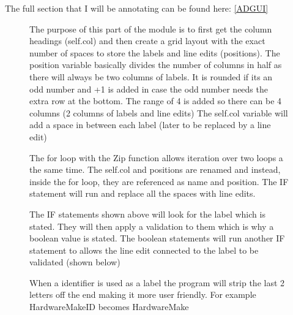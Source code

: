 The full section that I will be annotating can be found here: \ref{ADGUI}
\begin{landscape}

\begin{figure}[H]
    \caption{The purpose of this part of the module is to first get the column headings (self.col) and then create a grid layout with the exact number of spaces to store the labels and line edits (positions). The position variable basically divides the number of columns in half as there will always be two columns of labels. It is rounded if its an odd number and +1 is added in case the odd number needs the extra row at the bottom. The range of 4 is added so there can be 4 columns (2 columns of labels and line edits) \newline The self.col variable will add a space in between each label (later to be replaced by a line edit)}  
\end{figure}

\begin{figure}[H]
    \caption{The for loop with the Zip function allows iteration over two loops a the same time. The self.col and positions are renamed and instead, inside the for loop, they are referenced as name and position. \newline The IF statement will run and replace all the spaces with line edits.}  
\end{figure}

\begin{figure}[H]
    \caption{The IF statements shown above will look for the label which is stated. They will then apply a validation to them which is why a boolean value is stated. The boolean statements will run another IF statement to allows the line edit connected to the label to be validated (shown below)}  
\end{figure}


\begin{figure}[H]
    \caption{When a identifier is used as a label the program will strip the last 2 letters off the end making it more user friendly. For example HardwareMakeID becomes HardwareMake}  
\end{figure}



\end{landscape}
